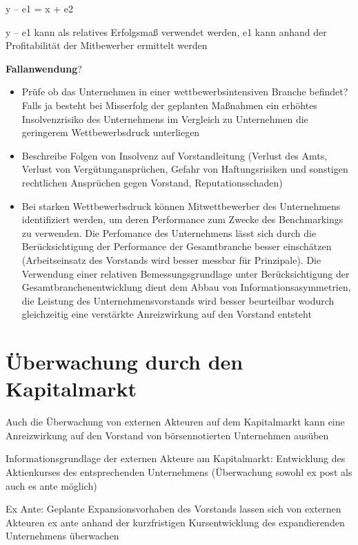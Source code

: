 \documentclass[
]{article}
\providecommand{\tightlist}{%
  \setlength{\itemsep}{0pt}\setlength{\parskip}{0pt}}
\begin{document}
y -- e1 = x + e2

y -- e1 kann als relatives Erfolgsmaß verwendet werden, e1 kann anhand
der Profitabilität der Mitbewerber ermittelt werden

\textbf{Fallanwendung}?

\begin{itemize}
\tightlist
\item
  Prüfe ob das Unternehmen in einer wettbewerbsintensiven Branche
  befindet? Falls ja besteht bei Misserfolg der geplanten Maßnahmen ein
  erhöhtes Insolvenzrisiko des Unternehmens im Vergleich zu Unternehmen
  die geringerem Wettbewerbsdruck unterliegen
\item
  Beschreibe Folgen von Insolvenz auf Vorstandleitung (Verlust des Amts,
  Verlust von Vergütungansprüchen, Gefahr von Haftungsrisiken und
  sonstigen rechtlichen Ansprüchen gegen Vorstand, Reputationsschaden)
\item
  Bei starken Wettbewerbsdruck können Mitwettbewerber des Unternehmens
  identifiziert werden, um deren Performance zum Zwecke des
  Benchmarkings zu verwenden. Die Perfomance des Unternehmens lässt sich
  durch die Berücksichtigung der Performance der Gesamtbranche besser
  einschätzen (Arbeitseinsatz des Vorstands wird besser messbar für
  Prinzipale). Die Verwendung einer relativen Bemessungsgrundlage unter
  Berücksichtigung der Gesamtbranchenentwicklung dient dem Abbau von
  Informationsasymmetrien, die Leistung des Unternehmensvorstands wird
  besser beurteilbar wodurch gleichzeitig eine verstärkte Anreizwirkung
  auf den Vorstand entsteht
\end{itemize}

\hypertarget{uxfcberwachung-durch-den-kapitalmarkt}{%
\section{Überwachung durch den
Kapitalmarkt}\label{uxfcberwachung-durch-den-kapitalmarkt}}

Auch die Überwachung von externen Akteuren auf dem Kapitalmarkt kann
eine Anreizwirkung auf den Vorstand von börsennotierten Unternehmen
ausüben

Informationsgrundlage der externen Akteure am Kapitalmarkt: Entwicklung
des Aktienkurses des entsprechenden Unternehmens (Überwachung sowohl ex
post als auch es ante möglich)

Ex Ante: Geplante Expansionsvorhaben des Vorstands lassen sich von
externen Akteuren ex ante anhand der kurzfristigen Kursentwicklung des
expandierenden Unternehmens überwachen
\end{document}
